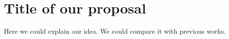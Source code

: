\section{Title of our proposal}
Here we could explain our idea. We could compare it with previous works.

